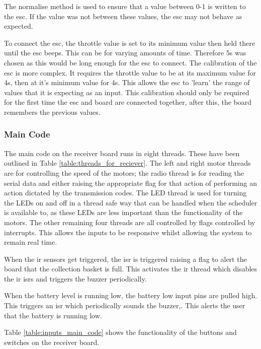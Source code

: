 \documentclass [12pt]{article}
\begin{document}
The normalise method is used to ensure that a value between 0-1 is written to the \gls{esc}. If the value was not between these values, the \gls{esc} may not behave as expected. 

To connect the \gls{esc}, the throttle value is set to its minimum value then held there until the \gls{esc} beeps. This can be for varying amounts of time. Therefore 5s was chosen as this would be long enough for the \gls{esc} to connect. The calibration of the \gls{esc} is more complex. It requires the throttle value to be at its maximum value for 4s, then at it's minimum value for 4s. This allows the \gls{esc} to 'learn' the range of values that it is expecting as an input. This calibration should only be required for the first time the \gls{esc} and board are connected together, after this, the board remembers the previous values.

\subsubsection{Main Code}

The main code on the receiver board runs in eight threads. These have been outlined in Table \ref{table:threads_for_reciever}. The left and right motor threads are for controlling the speed of the motors; the radio thread is for reading the serial data and either raising the appropriate flag for that action of performing an action dictated by the transmission codes. The LED thread is used for turning the LEDs on and off in a thread safe way that can be handled when the scheduler is available to, as these LEDs are less important than the functionality of the motors. The other remaining four threads are all controlled by flags controlled by interrupts. This allows the inputs to be responsive whilst allowing the system to remain real time. 

When the \gls{ir} sensors get triggered, the \gls{isr} is triggered raising a flag to alert the board that the collection basket is full. This activates the \gls{ir} thread which disables the \gls{ir} \gls{isr}s and triggers the buzzer periodically. 

When the battery level is running low, the battery low input pins are pulled high. This triggers an \gls{isr} which periodically sounds the buzzer,. This alerts the user that the battery is running low.  

Table \ref{table:inputs_main_code} shows the functionality of the buttons and switches on the receiver board. 
\end{document}
